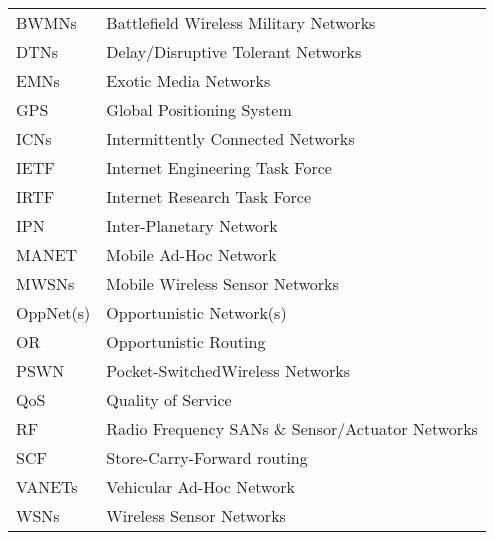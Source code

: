 %

\begin{tabular}{ll}
BWMNs & Battlefield Wireless Military Networks\\
DTNs & Delay/Disruptive Tolerant Networks\\
EMNs & Exotic Media Networks\\
GPS & Global Positioning System\\
ICNs & Intermittently Connected Networks\\
IETF & Internet Engineering Task Force\\
IRTF & Internet Research Task Force\\
IPN & Inter-Planetary Network\\
MANET & Mobile Ad-Hoc Network\\
MWSNs & Mobile Wireless Sensor Networks\\
OppNet(s) & Opportunistic Network(s)\\
OR & Opportunistic Routing\\
PSWN & Pocket-SwitchedWireless Networks\\
QoS & Quality of Service\\
RF & Radio Frequency
SANs \& Sensor/Actuator Networks\\
SCF & Store-Carry-Forward routing\\
VANETs & Vehicular Ad-Hoc Network\\
WSNs & Wireless Sensor Networks\\
\end{tabular}

